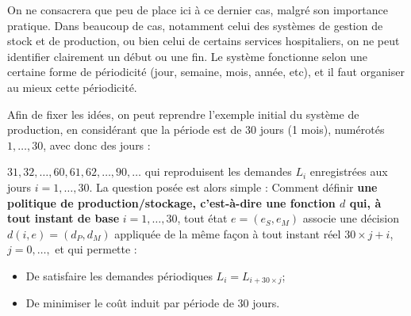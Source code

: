 On ne consacrera que peu de place ici à ce dernier cas, malgré son importance pratique. Dans beaucoup de cas, notamment celui des systèmes de gestion de stock et de production, ou bien celui de certains services hospitaliers, on ne peut identifier clairement un début ou une fin. Le système fonctionne selon une certaine forme de périodicité (jour, semaine, mois, année, etc), et il faut organiser au mieux cette périodicité. 

Afin de fixer les idées, on peut reprendre l'exemple initial du système de production, en considérant que la période est de 30 jours (1 mois), numérotés $1,\dots, 30$, avec donc des jours :

$31, 32, \dots, 60, 61, 62, \dots, 90, \dots$ qui reproduisent les demandes $L_i$ enregistrées aux jours $i = 1, \dots, 30$. La question posée est alors simple : Comment définir \textbf{une politique de production/stockage, c'est-à-dire une fonction $d$ qui, à tout instant de base} $i = 1, \dots, 30$, tout état $e = (e_S, e_M)$ associe une décision $d(i, e) = (d_P, d_M)$ appliquée de la même façon à tout instant réel $30\times j + i$, $j = 0, \dots,$ et qui permette :

\begin{itemize}[label=$\square$]
	\item De satisfaire les demandes périodiques $L_i = L_{i+30 \times j}$;
	\item	De minimiser le coût induit par période de 30 jours.
\end{itemize}

